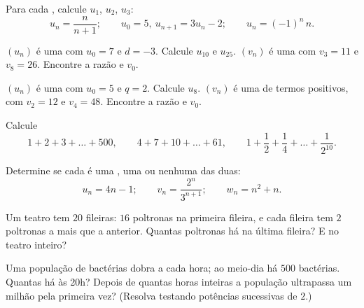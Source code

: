\begin{exercise}[$\star$]\label{exo:g11:seq:1}
Para cada , calcule $u_1$, $u_2$, $u_3$:
\[
u_n = \frac{n}{n+1}; \qquad
u_0 = 5,\ u_{n+1} = 3u_n - 2; \qquad
u_n = (-1)^n\,n .
\]
\end{exercise}

\begin{exercise}[$\star$]\label{exo:g11:seq:2}
$(u_n)$ é uma  com $u_0 = 7$ e $d = -3$. Calcule
$u_{10}$ e $u_{25}$. $(v_n)$ é uma  com $v_3 = 11$ e
$v_8 = 26$. Encontre a razão e $v_0$.
\end{exercise}

\begin{exercise}[$\star$]\label{exo:g11:seq:3}
$(u_n)$ é uma  com $u_0 = 5$ e $q = 2$. Calcule
$u_8$. $(v_n)$ é uma  de termos positivos, com
$v_2 = 12$ e $v_4 = 48$. Encontre a razão e $v_0$.
\end{exercise}

\begin{exercise}[$\star$]\label{exo:g11:seq:4}
Calcule
\[
1 + 2 + 3 + \dots + 500, \qquad
4 + 7 + 10 + \dots + 61, \qquad
1 + \frac12 + \frac14 + \dots + \frac{1}{2^{10}} .
\]
\end{exercise}

\begin{exercise}[$\star$]\label{exo:g11:seq:5}
Determine se cada  é uma , uma  ou nenhuma das duas:
\[
u_n = 4n - 1; \qquad
v_n = \frac{2^n}{3^{n+1}}; \qquad
w_n = n^2 + n .
\]
\end{exercise}

\begin{exercise}[$\star\star$]\label{exo:g11:seq:6}
Um teatro tem $20$ fileiras: $16$ poltronas na primeira fileira, e cada
fileira tem $2$ poltronas a mais que a anterior. Quantas poltronas há na
última fileira? E no teatro inteiro?
\end{exercise}

\begin{exercise}[$\star\star$]\label{exo:g11:seq:7}
Uma população de bactérias dobra a cada hora; ao meio-dia há $500$
bactérias. Quantas há às 20h? Depois de quantas horas inteiras a
população ultrapassa um milhão pela primeira vez? (Resolva testando
potências sucessivas de $2$.)
\end{exercise}

